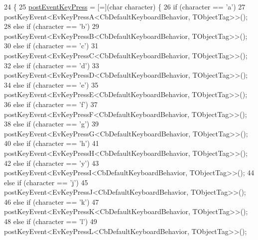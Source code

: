\begin{DoxyCode}
24     \{
25         \hyperlink{classkeyboard__client_1_1CbDefaultKeyboardBehavior_ac3a5e8c2cca0fd4117ddc192858d3771}{postEventKeyPress} = [=](\textcolor{keywordtype}{char} character) \{
26             \textcolor{keywordflow}{if} (character == \textcolor{charliteral}{'a'})
27                 postKeyEvent<EvKeyPressA<CbDefaultKeyboardBehavior, TObjectTag>>();
28             \textcolor{keywordflow}{else} \textcolor{keywordflow}{if} (character == \textcolor{charliteral}{'b'})
29                 postKeyEvent<EvKeyPressB<CbDefaultKeyboardBehavior, TObjectTag>>();
30             \textcolor{keywordflow}{else} \textcolor{keywordflow}{if} (character == \textcolor{charliteral}{'c'})
31                 postKeyEvent<EvKeyPressC<CbDefaultKeyboardBehavior, TObjectTag>>();
32             \textcolor{keywordflow}{else} \textcolor{keywordflow}{if} (character == \textcolor{charliteral}{'d'})
33                 postKeyEvent<EvKeyPressD<CbDefaultKeyboardBehavior, TObjectTag>>();
34             \textcolor{keywordflow}{else} \textcolor{keywordflow}{if} (character == \textcolor{charliteral}{'e'})
35                 postKeyEvent<EvKeyPressE<CbDefaultKeyboardBehavior, TObjectTag>>();
36             \textcolor{keywordflow}{else} \textcolor{keywordflow}{if} (character == \textcolor{charliteral}{'f'})
37                 postKeyEvent<EvKeyPressF<CbDefaultKeyboardBehavior, TObjectTag>>();
38             \textcolor{keywordflow}{else} \textcolor{keywordflow}{if} (character == \textcolor{charliteral}{'g'})
39                 postKeyEvent<EvKeyPressG<CbDefaultKeyboardBehavior, TObjectTag>>();
40             \textcolor{keywordflow}{else} \textcolor{keywordflow}{if} (character == \textcolor{charliteral}{'h'})
41                 postKeyEvent<EvKeyPressH<CbDefaultKeyboardBehavior, TObjectTag>>();
42             \textcolor{keywordflow}{else} \textcolor{keywordflow}{if} (character == \textcolor{charliteral}{'y'})
43                 postKeyEvent<EvKeyPressI<CbDefaultKeyboardBehavior, TObjectTag>>();
44             \textcolor{keywordflow}{else} \textcolor{keywordflow}{if} (character == \textcolor{charliteral}{'j'})
45                 postKeyEvent<EvKeyPressJ<CbDefaultKeyboardBehavior, TObjectTag>>();
46             \textcolor{keywordflow}{else} \textcolor{keywordflow}{if} (character == \textcolor{charliteral}{'k'})
47                 postKeyEvent<EvKeyPressK<CbDefaultKeyboardBehavior, TObjectTag>>();
48             \textcolor{keywordflow}{else} \textcolor{keywordflow}{if} (character == \textcolor{charliteral}{'l'})
49                 postKeyEvent<EvKeyPressL<CbDefaultKeyboardBehavior, TObjectTag>>();

\end{DoxyCode}

